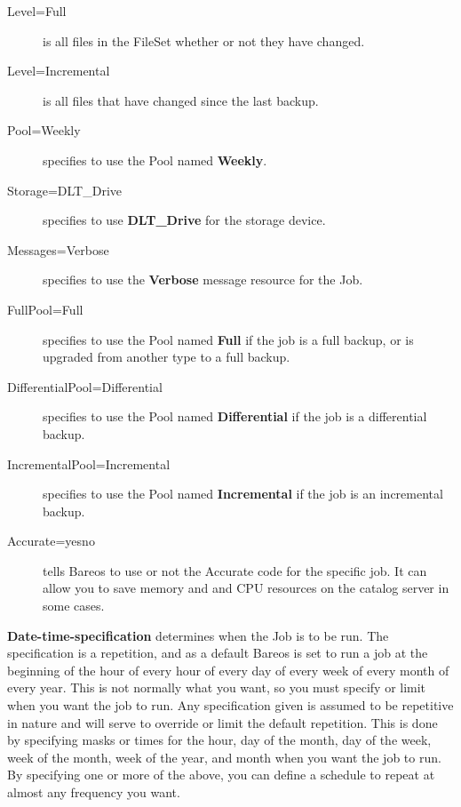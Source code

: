 \begin{description}
\begin{description}
\item [Level=Full]
is all files in the FileSet whether or not  they have changed.

\item [Level=Incremental]
is all files that have changed since  the last backup.

\item [Pool=Weekly]
specifies to use the Pool named {\bf Weekly}.

\item [Storage=DLT\_Drive]
specifies to use {\bf DLT\_Drive} for  the storage device.

\item [Messages=Verbose]
specifies to use the {\bf Verbose}  message resource for the Job.

\item [FullPool=Full]
specifies to use the Pool named {\bf Full}  if the job is a full backup, or
is upgraded from another type  to a full backup.

\item [DifferentialPool=Differential]
specifies to use the Pool named {\bf Differential} if the job is a
differential  backup.

\item [IncrementalPool=Incremental]
specifies to use the Pool  named {\bf Incremental} if the job is an
incremental  backup.

\item [Accurate=yes{\textbar}no]
tells Bareos to use or not the Accurate code for the specific job. It can
allow you to save memory and and CPU resources on the catalog server in some
cases.

\end{description}

{\bf Date-time-specification} determines when the  Job is to be run. The
specification is a repetition, and as  a default Bareos is set to run a job at
the beginning of the  hour of every hour of every day of every week of every
month  of every year. This is not normally what you want, so you  must specify
or limit when you want the job to run. Any  specification given is assumed to
be repetitive in nature and  will serve to override or limit the default
repetition. This  is done by specifying masks or times for the hour, day of the
month, day of the week, week of the month, week of the year,  and month when
you want the job to run. By specifying one or  more of the above, you can
define a schedule to repeat at  almost any frequency you want.


\end{description}
